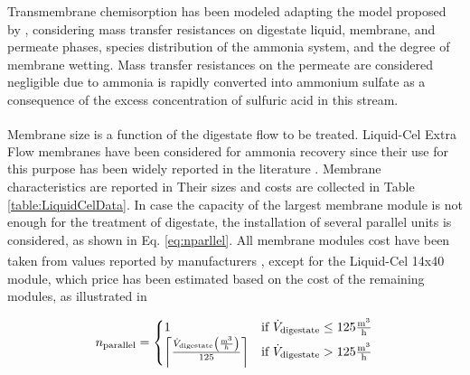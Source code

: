 \begin{refsection}[referencesCh6]

Transmembrane chemisorption has been modeled adapting the model proposed by \citet{rongwong2020}, considering mass transfer resistances on digestate liquid, membrane, and permeate phases, species distribution of the ammonia system, and the degree of membrane wetting. Mass transfer resistances on the permeate are considered negligible due to ammonia is rapidly converted into ammonium sulfate as a consequence of the excess concentration of sulfuric acid in this stream.

Membrane size is a function of the digestate flow to be treated. Liquid-Cel\textsuperscript{\texttrademark} Extra Flow membranes \citep{LiquidCelData} have been considered for ammonia recovery since their use for this purpose has been widely reported in the literature \citep{darestani2017hollow, rongwong2020, linstrom2001}. Membrane characteristics are reported in {} Their sizes and costs
are collected in Table \ref{table:LiquidCelData}.
In case the capacity of the largest membrane module is not enough for the treatment of digestate, the installation of several parallel units is considered, as shown in Eq. \ref{eq:nparllel}. All membrane modules cost have been taken from values reported by manufacturers \citep{SGProjects, DPCWaterSolutions}, except for the Liquid-Cel\textsuperscript{\texttrademark} 14x40 module, which price has been estimated based on the cost of the remaining modules, as illustrated in {}

\begin{align}
n_{\text{parallel}} =
\begin{cases}
1 & \text{if } \dot{V}_{\text{digestate}} \leq 125 \frac{\text{m}^3}{\text{h}}  \\
\ceil*{\frac{\dot{V}_{\text{digestate}} \left(\frac{\text{m}^3}{h}\right)}{125}} & \text{if } \dot{V}_{\text{digestate}} > 125 \frac{\text{m}^3}{\text{h}}
\end{cases} \label{eq:nparllel}
\end{align}


\end{refsection}
